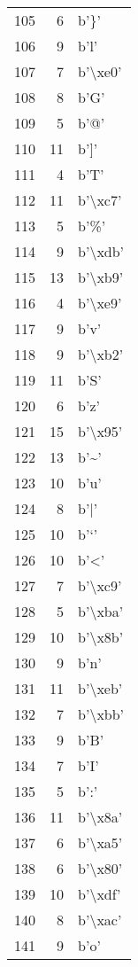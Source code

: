 \begin{tabular}{lrl}
105 &    6 &     b'\}' \\
106 &    9 &     b'l' \\
107 &    7 &  b'\textbackslash xe0' \\
108 &    8 &     b'G' \\
109 &    5 &     b'@' \\
110 &   11 &     b']' \\
111 &    4 &     b'T' \\
112 &   11 &  b'\textbackslash xc7' \\
113 &    5 &     b'\%' \\
114 &    9 &  b'\textbackslash xdb' \\
115 &   13 &  b'\textbackslash xb9' \\
116 &    4 &  b'\textbackslash xe9' \\
117 &    9 &     b'v' \\
118 &    9 &  b'\textbackslash xb2' \\
119 &   11 &     b'S' \\
120 &    6 &     b'z' \\
121 &   15 &  b'\textbackslash x95' \\
122 &   13 &     b'\textasciitilde ' \\
123 &   10 &     b'u' \\
124 &    8 &     b'|' \\
125 &   10 &     b'`' \\
126 &   10 &     b'<' \\
127 &    7 &  b'\textbackslash xc9' \\
128 &    5 &  b'\textbackslash xba' \\
129 &   10 &  b'\textbackslash x8b' \\
130 &    9 &     b'n' \\
131 &   11 &  b'\textbackslash xeb' \\
132 &    7 &  b'\textbackslash xbb' \\
133 &    9 &     b'B' \\
134 &    7 &     b'I' \\
135 &    5 &     b':' \\
136 &   11 &  b'\textbackslash x8a' \\
137 &    6 &  b'\textbackslash xa5' \\
138 &    6 &  b'\textbackslash x80' \\
139 &   10 &  b'\textbackslash xdf' \\
140 &    8 &  b'\textbackslash xac' \\
141 &    9 &     b'o' \\

\end{tabular}
